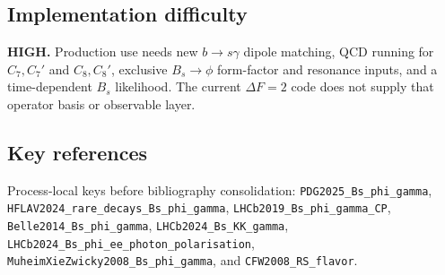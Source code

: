 \subsection*{Implementation difficulty}
\textbf{HIGH.}  Production use needs new \(b\to s\gamma\) dipole matching,
QCD running for \(C_7,C_7'\) and \(C_8,C_8'\), exclusive \(B_s\to\phi\)
form-factor and resonance inputs, and a time-dependent \(B_s\) likelihood.
The current \(\Delta F=2\) code does not supply that operator basis or
observable layer.

\subsection*{Key references}
Process-local keys before bibliography consolidation:
\texttt{PDG2025\_Bs\_phi\_gamma},
\texttt{HFLAV2024\_rare\_decays\_Bs\_phi\_gamma},
\texttt{LHCb2019\_Bs\_phi\_gamma\_CP},
\texttt{Belle2014\_Bs\_phi\_gamma},
\texttt{LHCb2024\_Bs\_KK\_gamma},
\texttt{LHCb2024\_Bs\_phi\_ee\_photon\_polarisation},
\texttt{MuheimXieZwicky2008\_Bs\_phi\_gamma}, and
\texttt{CFW2008\_RS\_flavor}.
